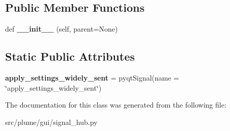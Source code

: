 \subsection*{Public Member Functions}
\begin{DoxyCompactItemize}
\item 
def {\bfseries \+\_\+\+\_\+init\+\_\+\+\_\+} (self, parent=None)\hypertarget{classplume-creator_1_1src_1_1plume_1_1gui_1_1signal__hub_1_1_signal_hub_a196f7c2dc39d9fd65a04aab9b7abda04}{}\label{classplume-creator_1_1src_1_1plume_1_1gui_1_1signal__hub_1_1_signal_hub_a196f7c2dc39d9fd65a04aab9b7abda04}

\end{DoxyCompactItemize}
\subsection*{Static Public Attributes}
\begin{DoxyCompactItemize}
\item 
{\bfseries apply\+\_\+settings\+\_\+widely\+\_\+sent} = pyqt\+Signal(name = \char`\"{}apply\+\_\+settings\+\_\+widely\+\_\+sent\char`\"{})\hypertarget{classplume-creator_1_1src_1_1plume_1_1gui_1_1signal__hub_1_1_signal_hub_af1b672e22400a7bb511aac334594be2d}{}\label{classplume-creator_1_1src_1_1plume_1_1gui_1_1signal__hub_1_1_signal_hub_af1b672e22400a7bb511aac334594be2d}

\end{DoxyCompactItemize}


The documentation for this class was generated from the following file\+:\begin{DoxyCompactItemize}
\item 
src/plume/gui/signal\+\_\+hub.\+py\end{DoxyCompactItemize}
